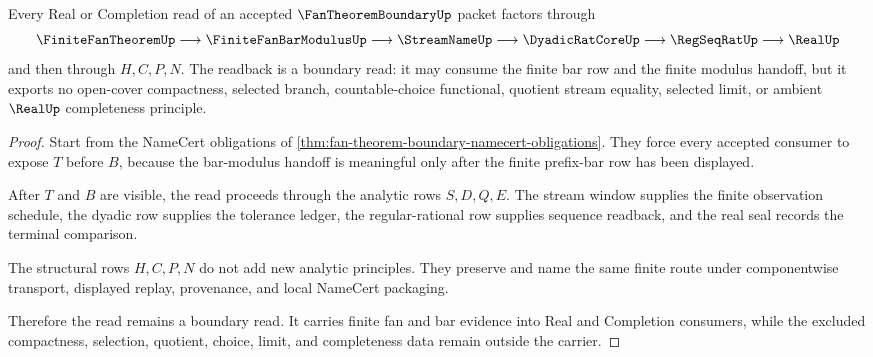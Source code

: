 \begin{theorem}
\label{thm:fan-theorem-boundary-uniform-bar-readback}
Every Real or Completion read of an accepted $\FanTheoremBoundaryUp$ packet factors through
$$
\FiniteFanTheoremUp \longrightarrow \FiniteFanBarModulusUp \longrightarrow \StreamNameUp \longrightarrow \DyadicRatCoreUp \longrightarrow \RegSeqRatUp \longrightarrow \RealUp
$$
and then through $H,C,P,N$. The readback is a boundary read: it may consume the finite bar row and the finite modulus handoff, but it exports no open-cover compactness, selected branch, countable-choice functional, quotient stream equality, selected limit, or ambient $\RealUp$ completeness principle.
\end{theorem}
\begin{proof}
Start from the NameCert obligations of \autoref{thm:fan-theorem-boundary-namecert-obligations}. They force every accepted consumer to expose $T$ before $B$, because the bar-modulus handoff is meaningful only after the finite prefix-bar row has been displayed.

After $T$ and $B$ are visible, the read proceeds through the analytic rows $S,D,Q,E$. The stream window supplies the finite observation schedule, the dyadic row supplies the tolerance ledger, the regular-rational row supplies sequence readback, and the real seal records the terminal comparison.

The structural rows $H,C,P,N$ do not add new analytic principles. They preserve and name the same finite route under componentwise transport, displayed replay, provenance, and local NameCert packaging.

Therefore the read remains a boundary read. It carries finite fan and bar evidence into Real and Completion consumers, while the excluded compactness, selection, quotient, choice, limit, and completeness data remain outside the carrier.
\end{proof}




